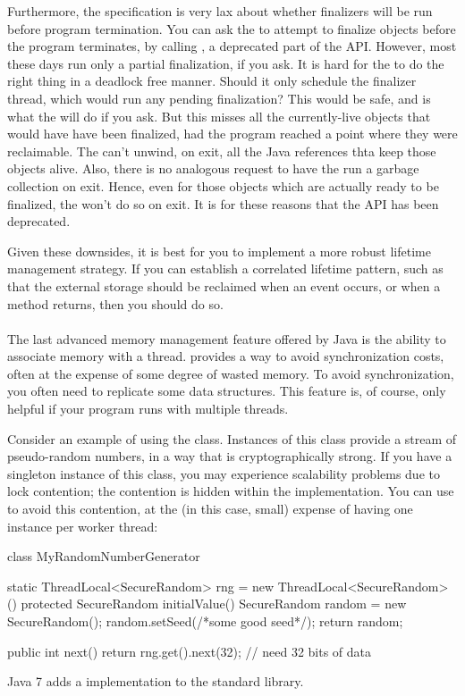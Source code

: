 Furthermore, the specification is very lax about whether finalizers will be run
before program termination. You can ask the \jre to attempt to finalize objects
before the program terminates, by calling
, a deprecated part of the API. However,
most \jres these days run only a partial finalization, if you ask. It is hard for
the \jre to do the right thing in a deadlock free manner. Should it only schedule
the finalizer thread, which would run any pending finalization? This would be
safe, and is what the \jre will do if you ask. But this misses all the
currently-live objects that would have have been finalized, had the program
reached a point where they were reclaimable. The \jre can't unwind, on exit, all
the Java references thta keep those objects alive. Also, there is no analogous
request to have the \jre run a garbage collection on exit. Hence, even for those
objects which are actually ready to be finalized, the \jre won't do so on exit.
It is for these reasons that the API has been deprecated.

Given these downsides, it is best for you to implement a more robust lifetime
management strategy. If you can establish a correlated lifetime pattern, such as
that the external storage should be reclaimed when an event occurs, or when a
method returns, then you should do so.

\paragraph{\TLS}
\tlsindex %

The last advanced memory management feature offered by Java is the ability to
associate memory with a thread. \Tls provides a way to avoid
synchronization costs, often at the expense of some degree of wasted memory. To
avoid synchronization, you often need to replicate some data structures. This
feature is, of course, only helpful if your program runs with multiple threads.

Consider an example of using the  class. Instances of this
class provide a stream of pseudo-random numbers, in a way that is
cryptographically strong. If you have a singleton instance of this class, you may
experience scalability problems due to lock contention; the contention is hidden
within the  implementation. You can use \tls
to avoid this contention, at the (in this case, small) expense of having one
instance per worker thread:
\begin{shortlisting}
class MyRandomNumberGenerator {
   static ThreadLocal<SecureRandom> rng = new ThreadLocal<SecureRandom>() {
      protected SecureRandom initialValue() {
         SecureRandom random = new SecureRandom();
         random.setSeed(/*some good seed*/);
         return random;
      }
   }
   
   public int next() {
      return rng.get().next(32); // need 32 bits of data
   }
}
\end{shortlisting} 
Java 7 adds a  implementation to the standard library.

